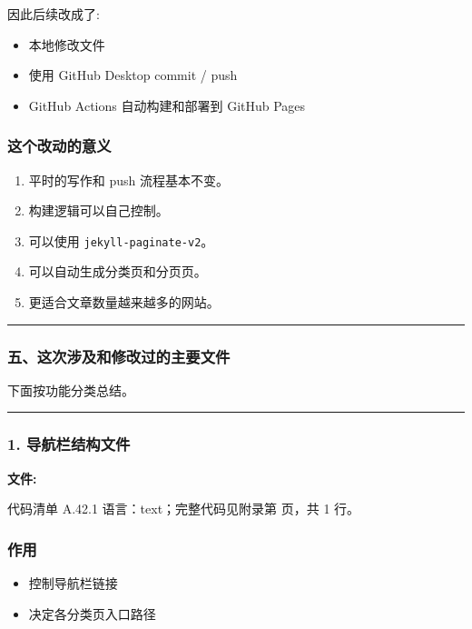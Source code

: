 \documentclass[lang=cn,scheme=chinese,color=blue,device=normal,toc=onecol,math=cm]{elegantbook}
\begin{document}
因此后续改成了:\par


\begin{itemize}
\item 本地修改文件
\item 使用 GitHub Desktop commit /\allowbreak{} push
\item GitHub Actions 自动构建和部署到 GitHub Pages
\end{itemize}


\subsubsection{这个改动的意义}


\begin{enumerate}
\item 平时的写作和 push 流程基本不变。
\item 构建逻辑可以自己控制。
\item 可以使用 \texttt{jekyll-paginate-v2}。
\item 可以自动生成分类页和分页页。
\item 更适合文章数量越来越多的网站。
\end{enumerate}


\medskip\hrule\medskip


\subsubsection{五、这次涉及和修改过的主要文件}


下面按功能分类总结。\par


\medskip\hrule\medskip


\subsubsection{1. 导航栏结构文件}


\textbf{文件:}\par


\begin{codeindexbox}{代码清单 A.42.1}
语言：text；完整代码见附录第 \pageref{code:42:1} 页，共 1 行。
\end{codeindexbox}


\subsubsection{作用}


\begin{itemize}
\item 控制导航栏链接
\item 决定各分类页入口路径
\end{itemize}
\end{document}
